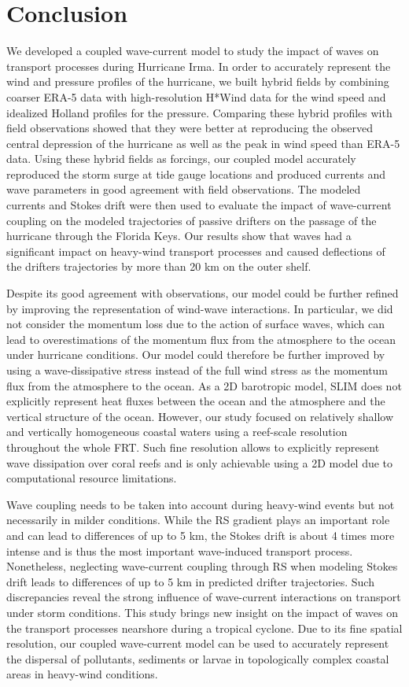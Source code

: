 \documentclass[preprint,12pt,authoryear]{elsarticle}
\begin{document}
\section{Conclusion}

We developed a coupled wave-current model to study the impact of waves on transport processes during Hurricane Irma. In order to accurately represent the wind and pressure profiles of the hurricane, we built hybrid fields by combining coarser ERA-5 data with high-resolution H*Wind data for the wind speed and idealized Holland profiles for the pressure. Comparing these hybrid profiles with field observations showed that they were better at reproducing the observed central depression of the hurricane as well as the peak in wind speed than ERA-5 data. Using these hybrid fields as forcings, our coupled model accurately reproduced the storm surge at tide gauge locations and produced currents and wave parameters in good agreement with field observations. The modeled currents and Stokes drift were then used to evaluate the impact of wave-current coupling on the modeled trajectories of passive drifters on the passage of the hurricane through the Florida Keys. Our results show that waves had a significant impact on heavy-wind transport processes and caused deflections of the drifters trajectories by more than 20 km on the outer shelf.

Despite its good agreement with observations, our model could be further refined by improving the representation of wind-wave interactions. In particular, we did not consider the momentum loss due to the action of surface waves, which can lead to overestimations of the momentum flux from the atmosphere to the ocean under hurricane conditions. Our model could therefore be further improved by using a wave-dissipative stress instead of the full wind stress as the momentum flux from the atmosphere to the ocean. As a 2D barotropic model, SLIM does not explicitly represent heat fluxes between the ocean and the atmosphere and the vertical structure of the ocean. However, our study focused on relatively shallow and vertically homogeneous coastal waters using a reef-scale resolution throughout the whole FRT. Such fine resolution allows to explicitly represent wave dissipation over coral reefs and is only achievable using a 2D model due to computational resource limitations.

Wave coupling needs to be taken into account during heavy-wind events but not necessarily in milder conditions. While the RS gradient plays an important role and can lead to differences of up to 5 km, the Stokes drift is about 4 times more intense and is thus the most important wave-induced transport process. Nonetheless, neglecting wave-current coupling through RS when modeling Stokes drift leads to differences of up to 5 km in predicted drifter trajectories. Such discrepancies reveal the strong influence of wave-current interactions on transport under storm conditions. This study brings new insight on the impact of waves on the transport processes nearshore during a tropical cyclone. Due to its fine spatial resolution, our coupled wave-current model can be used to accurately represent the dispersal of pollutants, sediments or larvae in topologically complex coastal areas in heavy-wind conditions.  
\end{document}

